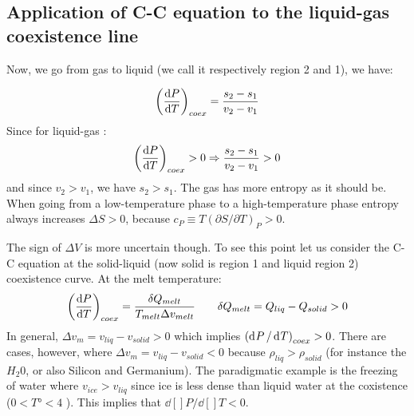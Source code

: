 \documentclass[../main/main.tex]{subfiles}
\begin{document}
\subsection{Application of C-C equation to the liquid-gas coexistence line}
 Now, we go from gas to liquid (we call it respectively region 2 and 1), we have:

\begin{equation}
  \qty(\dv{P}{T} )_{coex} = \frac{s_2 - s_1}{v_2 - v_1}
  \label{eq:}
\end{equation}
Since for liquid-gas :
\begin{equation}
  \qty(\dv{P}{T} )_{coex} > 0 \Rightarrow \frac{s_2 - s_1}{v_2 - v_1} > 0
  \label{eq:}
\end{equation}
and since \( v_2 > v_1 \), we have \( s_2 > s_1 \). The gas has more entropy as it should be. When going from a low-temperature phase to a high-temperature phase entropy always increases \( \Delta S > 0 \), because \( c_P \equiv T (\partial{S}/\partial{T}  )_P > 0 \).

The sign of \( \Delta V \) is more uncertain though. To see this point let us consider the C-C equation at the solid-liquid (now solid is region 1 and liquid region 2) coexistence curve.
At the melt temperature:
\begin{equation}
  \qty(\dv{P}{T} )_{coex} = \frac{\delta Q_{melt}}{T_{melt}\Delta v_{melt}} \qquad \delta Q_{melt} = Q_{liq} - Q_{solid} > 0
  \label{eq:}
\end{equation}
In general, \( \Delta v_m = v_{liq} - v_{solid} > 0 \) which implies \( \qty( \dd[]{P}/\dd[]{T}   )_{coex} > 0  \). There are cases, however, where \( \Delta v_m = v_{liq} - v_{solid} < 0 \) because \( \rho_{liq} > \rho _{solid} \) (for instance the \( H_2 0 \), or also Silicon and Germanium). The paradigmatic example is the freezing of water where \( v_{ice} > v_{liq} \) since ice is less dense than liquid water at the coxistence (\( 0 < T° < 4 \) ). This implies that \( \dd[]{P}/\dd[]{T} < 0   \).
\end{document}
